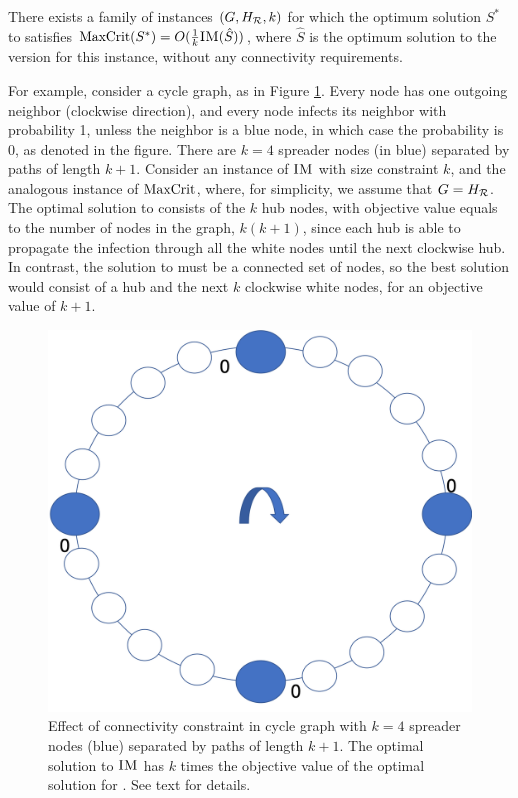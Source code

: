 \begin{observation}
\label{obs:infmax}
There exists a family of instances $(G, H_{\mathcal{R}}, k)$ for which the optimum solution
$S^*$ to \maxcrit{} satisfies
$\text{MaxCrit}(S^*) =O(\frac{1}{k}\textsc{IM}(\hat{S}))$, where $\hat{S}$ is the optimum
solution to the \infmax{} version for this instance, without any connectivity requirements.
\end{observation}

For example, consider a cycle graph, as in Figure \ref{fig:observation}. Every node has one outgoing neighbor (clockwise direction), and every node infects its neighbor with probability 1, unless the neighbor is a blue node, in which case the probability is 0, as denoted in the figure. There are $k=4$ spreader nodes (in blue) separated by paths of length $k+1$. Consider an instance of $\textsc{IM}{}$ with size constraint $k$, and the analogous instance of $\text{MaxCrit}{}$, where, for simplicity, we assume that $G = H_{\mathcal{R}}$. The optimal solution to \infmax{} consists of the $k$ hub nodes, with objective value equals to the number of nodes in the graph, $k(k+1)$, since each hub is able to propagate the infection through all the white nodes until the next clockwise hub. In contrast, the solution to \maxcrit{} must be a connected set of nodes, so the best solution would consist of a hub and the next $k$ clockwise white nodes, for an objective value of $k + 1$.

\begin{figure}
    \centering
    \includegraphics[width=.5\columnwidth]{img/observation.png}
    \caption{Effect of connectivity constraint in cycle graph with $k=4$ spreader nodes (blue) separated by paths of length $k + 1$. The optimal solution to $\textsc{IM}{}$ has $k$ times the objective value of the optimal solution for \maxcrit{}. See text for details.}
    \label{fig:observation}
\end{figure}

